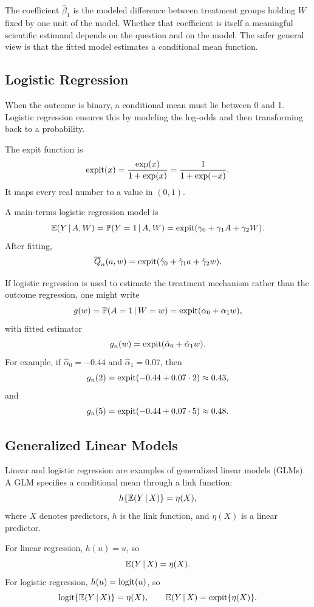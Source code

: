 The coefficient $\hat\beta_1$ is the modeled difference between treatment groups holding $W$ fixed by one unit of the model. Whether that coefficient is itself a meaningful scientific estimand depends on the question and on the model. The safer general view is that the fitted model estimates a conditional mean function.

\subsection{Logistic Regression}

When the outcome is binary, a conditional mean must lie between 0 and 1. Logistic regression ensures this by modeling the log-odds and then transforming back to a probability.

\begin{definition}
The expit function is
\[
\operatorname{expit}(x)=\frac{\exp(x)}{1+\exp(x)}
=\frac{1}{1+\exp(-x)}.
\]
It maps every real number to a value in $(0,1)$.
\end{definition}

A main-terms logistic regression model is
\[
\mathbb{E}(Y\,\vert\, A,W)
=\mathbb{P}(Y=1\,\vert\, A,W)
=\operatorname{expit}(\gamma_0+\gamma_1A+\gamma_2W).
\]
After fitting,
\[
\overline{Q}_n(a,w)=\operatorname{expit}(\hat\gamma_0+\hat\gamma_1a+\hat\gamma_2w).
\]

If logistic regression is used to estimate the treatment mechanism rather than the outcome regression, one might write
\[
g(w)=\mathbb{P}(A=1\,\vert\, W=w)
=\operatorname{expit}(\alpha_0+\alpha_1w),
\]
with fitted estimator
\[
g_n(w)=\operatorname{expit}(\hat\alpha_0+\hat\alpha_1w).
\]
For example, if $\hat\alpha_0=-0.44$ and $\hat\alpha_1=0.07$, then
\[
g_n(2)=\operatorname{expit}(-0.44+0.07\cdot 2)\approx 0.43,
\]
and
\[
g_n(5)=\operatorname{expit}(-0.44+0.07\cdot 5)\approx 0.48.
\]

\subsection{Generalized Linear Models}

Linear and logistic regression are examples of generalized linear models (GLMs). A GLM specifies a conditional mean through a link function:
\[
h\{\mathbb{E}(Y\,\vert\, X)\}=\eta(X),
\]
where $X$ denotes predictors, $h$ is the link function, and $\eta(X)$ is a linear predictor.

For linear regression, $h(u)=u$, so
\[
\mathbb{E}(Y\,\vert\, X)=\eta(X).
\]
For logistic regression, $h(u)=\operatorname{logit}(u)$, so
\[
\operatorname{logit}\{\mathbb{E}(Y\,\vert\, X)\}=\eta(X),
\qquad
\mathbb{E}(Y\,\vert\, X)=\operatorname{expit}\{\eta(X)\}.
\]


